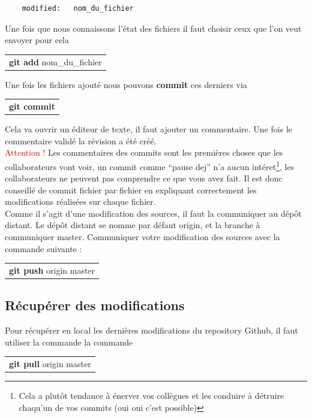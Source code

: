 \documentclass[a4paper,10pt]{article}
\begin{document}
\begin{spacing}{1.5}
\begin{lstlisting}
    modified:   nom_du_fichier
\end{lstlisting}
Une fois que nous connaissons l'état des fichiers il faut choisir ceux que l'on veut envoyer
pour cela
\begin{center}
  \begin{tabular}{c}
    \rowcolor{lightgray!50!white}
      \textbf{git add} nom\_du\_fichier
  \end{tabular}
\end{center}
Une fois les fichiers ajouté nous pouvons \textbf{commit} ces derniers via
\begin{center}
  \begin{tabular}{c}
    \rowcolor{lightgray!50!white}
      \textbf{git commit}
  \end{tabular}
\end{center}
Cela va ouvrir un éditeur de texte, il faut ajouter un commentaire. Une fois le
commentaire validé la révision a été créé.\\ \textcolor{red}{Attention !} Les
commentaires des commits sont les premières choses que les collaborateurs vont
voir, un commit comme ``pause dej'' n'a aucun intéret\footnote{Cela a plutôt
  tendance à énerver vos collègues et les conduire à détruire chaqu'un de vos
  commits (oui oui c'est possible)}, les collaborateurs ne peuvent pas
comprendre ce que vous avez fait. Il est donc conseillé de commit fichier par
fichier en expliquant correctement les modifications réalisées sur chaque
fichier.\\
Comme il s'agit d'une modification des sources, il faut la communiquer au dépôt
distant. Le dépôt distant se nomme par défaut origin, et la branche à
communiquer master. Communiquer votre modification des sources avec la commande
suivante :
\begin{center}
  \begin{tabular}{c}
    \rowcolor{lightgray!50!white}
      \textbf{git push} origin master
  \end{tabular}
\end{center}

\newpage
\subsection*{Récupérer des modifications}
Pour récupérer en local les dernières modifications du repository Github, il
faut utiliser la commande la commande
\begin{center}
  \begin{tabular}{c}
    \rowcolor{lightgray!50!white}
      \textbf{git pull} origin master
  \end{tabular}
\end{center}

\newpage
\end{spacing}
\end{document}
